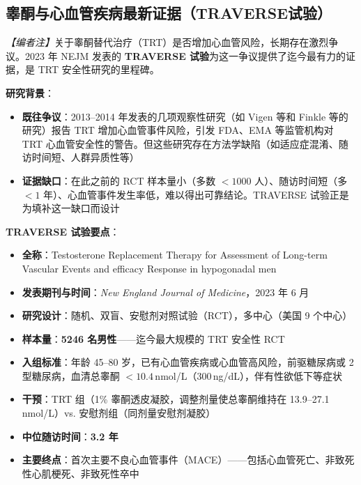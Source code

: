 \subsection{睾酮与心血管疾病最新证据（TRAVERSE试验）}
\label{subsec:traverse_trial}

\noindent\textit{【编者注】}关于睾酮替代治疗（TRT）是否增加心血管风险，长期存在激烈争议。2023 年 NEJM 发表的 \textbf{TRAVERSE 试验}为这一争议提供了迄今最有力的证据，是 TRT 安全性研究的里程碑。

\vspace{0.5em}
\noindent\textbf{研究背景}：

\begin{itemize}[leftmargin=2cm]
	\item \textbf{既往争议}：2013--2014 年发表的几项观察性研究（如 Vigen 等和 Finkle 等的研究）报告 TRT 增加心血管事件风险，引发 FDA、EMA 等监管机构对 TRT 心血管安全性的警告。但这些研究存在方法学缺陷（如适应症混淆、随访时间短、人群异质性等）
	\item \textbf{证据缺口}：在此之前的 RCT 样本量小（多数 $<1000$ 人）、随访时间短（多 $<1$ 年）、心血管事件发生率低，难以得出可靠结论。TRAVERSE 试验正是为填补这一缺口而设计
\end{itemize}

\vspace{0.5em}
\noindent\textbf{TRAVERSE 试验要点}：

\begin{itemize}[leftmargin=2cm]
	\item \textbf{全称}：Testosterone Replacement Therapy for Assessment of Long-term Vascular Events and efficacy Response in hypogonadal men
	\item \textbf{发表期刊与时间}：\textit{New England Journal of Medicine}，2023 年 6 月
	\item \textbf{研究设计}：随机、双盲、安慰剂对照试验（RCT），多中心（美国 9 个中心）
	\item \textbf{样本量}：\textbf{5246 名男性}——迄今最大规模的 TRT 安全性 RCT
	\item \textbf{入组标准}：年龄 45--80 岁，已有心血管疾病或心血管高风险，前驱糖尿病或 2 型糖尿病，血清总睾酮 $<10.4\,$nmol/L（300\,ng/dL），伴有性欲低下等症状
	\item \textbf{干预}：TRT 组（1\% 睾酮透皮凝胶，调整剂量使总睾酮维持在 13.9--27.1\,nmol/L）vs. 安慰剂组（同剂量安慰剂凝胶）
	\item \textbf{中位随访时间}：\textbf{3.2 年}
	\item \textbf{主要终点}：首次主要不良心血管事件（MACE）——包括心血管死亡、非致死性心肌梗死、非致死性卒中
\end{itemize}

